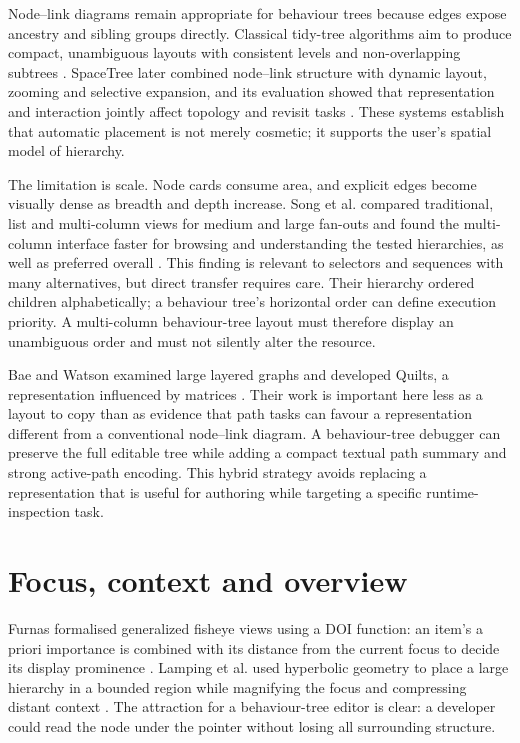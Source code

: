 Node--link diagrams remain appropriate for behaviour trees because edges expose ancestry and sibling groups directly. Classical tidy-tree algorithms aim to produce compact, unambiguous layouts with consistent levels and non-overlapping subtrees \parencite{reingold1981tidier}. SpaceTree later combined node--link structure with dynamic layout, zooming and selective expansion, and its evaluation showed that representation and interaction jointly affect topology and revisit tasks \parencite{plaisant2002spacetree}. These systems establish that automatic placement is not merely cosmetic; it supports the user's spatial model of hierarchy.

The limitation is scale. Node cards consume area, and explicit edges become visually dense as breadth and depth increase. Song et al. compared traditional, list and multi-column views for medium and large fan-outs and found the multi-column interface faster for browsing and understanding the tested hierarchies, as well as preferred overall \parencite{song2010largefanout}. This finding is relevant to selectors and sequences with many alternatives, but direct transfer requires care. Their hierarchy ordered children alphabetically; a behaviour tree's horizontal order can define execution priority. A multi-column behaviour-tree layout must therefore display an unambiguous order and must not silently alter the resource.

Bae and Watson examined large layered graphs and developed Quilts, a representation influenced by matrices \parencite{bae2011quilts}. Their work is important here less as a layout to copy than as evidence that path tasks can favour a representation different from a conventional node--link diagram. A behaviour-tree debugger can preserve the full editable tree while adding a compact textual path summary and strong active-path encoding. This hybrid strategy avoids replacing a representation that is useful for authoring while targeting a specific runtime-inspection task.

\section{Focus, context and overview}

Furnas formalised generalized fisheye views using a \ac{DOI} function: an item's a priori importance is combined with its distance from the current focus to decide its display prominence \parencite{furnas1986fisheye}. Lamping et al. used hyperbolic geometry to place a large hierarchy in a bounded region while magnifying the focus and compressing distant context \parencite{lamping1995hyperbolic}. The attraction for a behaviour-tree editor is clear: a developer could read the node under the pointer without losing all surrounding structure.

